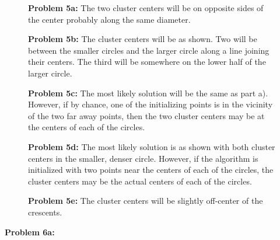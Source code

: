 \documentclass[11pt]{article}
\numberwithin{equation}{section}  %
\begin{document}
\vspace*{0.25in}



\FloatBarrier
\begin{figure}[H]
\centering
{}
\caption{\textbf{Problem 5a: }The two cluster centers will be on opposite sides of the center probably along the same diameter.}
\label{fig:FigureExample}
\end{figure}

\vspace*{0.25in}
\begin{figure}[H]
\centering
{}
\caption{\textbf{Problem 5b: }The cluster centers will be as shown. Two will be between the smaller circles and the larger circle along a line joining their centers. The third will be somewhere on the lower half of the larger circle.}
\label{fig:FigureExample3}
\end{figure}

\vspace*{0.25in}
\begin{figure}[H]
\centering
{}
\caption{\textbf{Problem 5c: }The most likely solution will be the same as part a). However, if by chance, one of the initializing points is in the vicinity of the two far away points, then the two cluster centers may be at the centers of each of the circles.}
\label{fig:FigureExample4}
\end{figure}

\vspace*{0.25in}
\begin{figure}[H]
\centering
{}
\caption{\textbf{Problem 5d: }The most likely solution is as shown with both cluster centers in the smaller, denser circle. However, if the algorithm is initialized with two points near the centers of each of the circles, the cluster centers may be the actual centers of each of the circles.}
\label{fig:FigureExample5}
\end{figure}

\vspace*{0.25in}

\begin{figure}[H]
\centering
{}
\caption{\textbf{Problem 5e: }The cluster centers will be slightly off-center of the crescents.}
\label{fig:FigureExample6}
\end{figure}
\FloatBarrier
\vspace*{0.25in}
\noindent\textbf{Problem 6a: }
\end{document}
